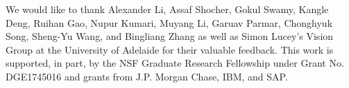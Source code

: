 
We would like to thank Alexander Li, Assaf Shocher,  Gokul Swamy, Kangle Deng, Ruihan Gao, Nupur Kumari, Muyang Li, Garuav Parmar, Chonghyuk Song, Sheng-Yu Wang, and Bingliang Zhang as well as Simon Lucey's Vision Group at the University of Adelaide for their valuable feedback.
This work is supported, in part, by the NSF Graduate Research Fellowship under Grant No. DGE1745016 and grants from J.P. Morgan Chase, IBM, and SAP. 
